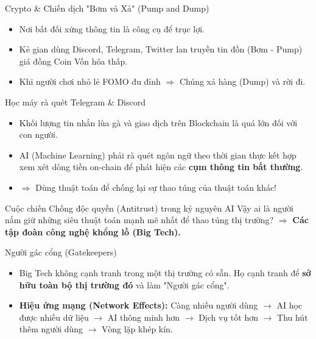 \documentclass[aspectratio=169]{beamer}
\begin{document}
\begin{frame}{Crypto \& Chiến dịch "Bơm và Xả" (Pump and Dump)}
    \begin{itemize}
        \item Nơi bất đối xứng thông tin là công cụ để trục lợi.
        \item Kẻ gian dùng Discord, Telegram, Twitter lan truyền tin đồn (Bơm - Pump) giá đồng Coin Vốn hóa thấp.
        \item Khi người chơi nhỏ lẻ FOMO đu đỉnh $\Rightarrow$ Chúng xả hàng (Dump) và rời đi.
    \end{itemize}
\end{frame}

\begin{frame}{Học máy rà quét Telegram \& Discord}
    \begin{itemize}
        \item Khối lượng tin nhắn lùa gà và giao dịch trên Blockchain là quá lớn đối với con người.
        \item AI (Machine Learning) phải rà quét ngôn ngữ theo thời gian thực kết hợp xem xét dòng tiền on-chain để phát hiện các \textbf{cụm thông tin bất thường}.
        \item $\Rightarrow$ Dùng thuật toán để chống lại sự thao túng của thuật toán khác!
    \end{itemize}
\end{frame}

\begin{frame}{Cuộc chiến Chống độc quyền (Antitrust) trong kỷ nguyên AI}
    Vậy ai là người nắm giữ những siêu thuật toán mạnh mẽ nhất để thao túng thị trường?
    \vspace{0.2cm}
    $\Rightarrow$ \textbf{Các tập đoàn công nghệ khổng lồ (Big Tech).}
\end{frame}

\begin{frame}{Người gác cổng (Gatekeepers)}
    \begin{itemize}
        \item Big Tech không cạnh tranh trong một thị trường có sẵn. Họ cạnh tranh để \textbf{sở hữu toàn bộ thị trường đó} và làm "Người gác cổng".
        \item \textbf{Hiệu ứng mạng (Network Effects):} Càng nhiều người dùng $\rightarrow$ AI học được nhiều dữ liệu $\rightarrow$ AI thông minh hơn $\rightarrow$ Dịch vụ tốt hơn $\rightarrow$ Thu hút thêm người dùng $\rightarrow$ Vòng lặp khép kín.
    \end{itemize}
\end{frame}
\end{document}
